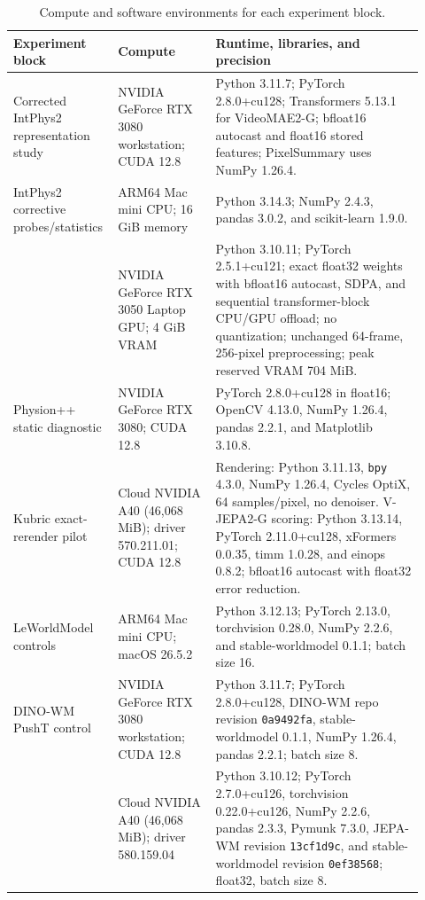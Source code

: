 \begin{table}[htbp]
\centering
\footnotesize
\setlength{\tabcolsep}{3.2pt}
\caption{Compute and software environments for each experiment block.}
\label{tab:compute-environments}
\begin{tabular}{@{}>{\raggedright\arraybackslash}p{0.20\linewidth}>{\raggedright\arraybackslash}p{0.23\linewidth}>{\raggedright\arraybackslash}p{0.49\linewidth}@{}}
\toprule
Experiment block & Compute & Runtime, libraries, and precision \\
\midrule
Corrected IntPhys2 representation study & NVIDIA GeForce RTX 3080 workstation; CUDA 12.8 & Python 3.11.7; PyTorch 2.8.0+cu128; Transformers 5.13.1 for VideoMAE2-G; bfloat16 autocast and float16 stored features; PixelSummary uses NumPy 1.26.4. \\
IntPhys2 corrective probes/statistics & ARM64 Mac mini CPU; 16 GiB memory & Python 3.14.3; NumPy 2.4.3, pandas 3.0.2, and scikit-learn 1.9.0. \\
{\color{black}V-JEPA2-G multi-dose grid} & {\color{black}NVIDIA GeForce RTX 3050 Laptop GPU; 4 GiB VRAM} & {\color{black}Python 3.10.11; PyTorch 2.5.1+cu121; exact float32 weights with bfloat16 autocast, SDPA, and sequential transformer-block CPU/GPU offload; no quantization; unchanged 64-frame, 256-pixel preprocessing; peak reserved VRAM 704 MiB.} \\
Physion++ static diagnostic & NVIDIA GeForce RTX 3080; CUDA 12.8 & PyTorch 2.8.0+cu128 in float16; OpenCV 4.13.0, NumPy 1.26.4, pandas 2.2.1, and Matplotlib 3.10.8. \\
Kubric exact-rerender pilot & Cloud NVIDIA A40 (46,068 MiB); driver 570.211.01; CUDA 12.8 & Rendering: Python 3.11.13, \texttt{bpy} 4.3.0, NumPy 1.26.4, Cycles OptiX, 64 samples/pixel, no denoiser. V-JEPA2-G scoring: Python 3.13.14, PyTorch 2.11.0+cu128, xFormers 0.0.35, timm 1.0.28, and einops 0.8.2; bfloat16 autocast with float32 error reduction. \\
LeWorldModel controls & ARM64 Mac mini CPU; macOS 26.5.2 & Python 3.12.13; PyTorch 2.13.0, torchvision 0.28.0, NumPy 2.2.6, and stable-worldmodel 0.1.1; batch size 16. \\
DINO-WM PushT control & NVIDIA GeForce RTX 3080 workstation; CUDA 12.8 & Python 3.11.7; PyTorch 2.8.0+cu128, DINO-WM repo revision \texttt{0a9492fa}, stable-worldmodel 0.1.1, NumPy 1.26.4, pandas 2.2.1; batch size 8. \\
{\leavevmode\color{black}JEPA-WM PushT control} & {\leavevmode\color{black}Cloud NVIDIA A40 (46,068 MiB); driver 580.159.04} & {\leavevmode\color{black}Python 3.10.12; PyTorch 2.7.0+cu126, torchvision 0.22.0+cu126, NumPy 2.2.6, pandas 2.3.3, Pymunk 7.3.0, JEPA-WM revision \texttt{13cf1d9c}, and stable-worldmodel revision \texttt{0ef38568}; float32, batch size 8.} \\
\bottomrule
\end{tabular}
\end{table}

